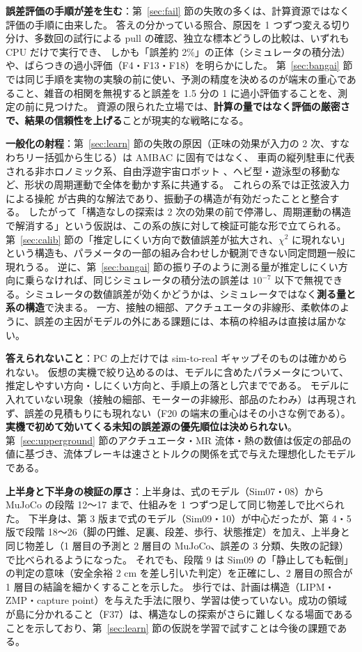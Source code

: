 \documentclass[paper=a4paper,fontsize=10pt,twocolumn,column_gap=2zw,line_length=24zw,number_of_lines=46,head_space=20mm]{jlreq}
\begin{document}
\textbf{誤差評価の手順が差を生む}：第~\ref{sec:fail} 節の失敗の多くは、計算資源ではなく評価の手順に由来した。
答えの分かっている照合、原因を 1 つずつ変える切り分け、多数回の試行による pull の確認、独立な標本どうしの比較は、いずれも CPU だけで実行でき、
しかも「誤差約 2\%」の正体（シミュレータの積分法）や、ばらつきの過小評価（F4・F13・F18）を明らかにした。
第~\ref{sec:bangai} 節では同じ手順を実物の実験の前に使い、予測の精度を決めるのが端末の重心であること、雑音の相関を無視すると誤差を 1.5 分の 1 に過小評価することを、測定の前に見つけた。
資源の限られた立場では、\textbf{計算の量ではなく評価の厳密さで、結果の信頼性を上げる}ことが現実的な戦略になる。

\textbf{一般化の射程}：第~\ref{sec:learn} 節の失敗の原因（正味の効果が入力の 2 次、すなわちリー括弧から生じる）は AMBAC に固有ではなく、
車両の縦列駐車に代表される非ホロノミック系、自由浮遊宇宙ロボット \cite{nakamura1991}、ヘビ型・遊泳型の移動など、形状の周期運動で全体を動かす系に共通する。
これらの系では正弦波入力による操舵 \cite{murray1993} が古典的な解法であり、振動子の構造が有効だったことと整合する。
したがって「構造なしの探索は 2 次の効果の前で停滞し、周期運動の構造で解消する」という仮説は、この系の族に対して検証可能な形で立てられる。
第~\ref{sec:calib} 節の「推定しにくい方向で数値誤差が拡大され、$\chi^2$ に現れない」という構造も、パラメータの一部の組み合わせしか観測できない同定問題一般に現れうる。
逆に、第~\ref{sec:bangai} 節の振り子のように測る量が推定しにくい方向に乗らなければ、同じシミュレータの積分法の誤差は $10^{-7}$ 以下で無視できる。シミュレータの数値誤差が効くかどうかは、シミュレータではなく\textbf{測る量と系の構造}で決まる。
一方、接触の細部、アクチュエータの非線形、柔軟体のように、誤差の主因がモデルの外にある課題には、本稿の枠組みは直接は届かない。

\textbf{答えられないこと}：PC の上だけでは sim-to-real ギャップそのものは確かめられない。
仮想の実機で絞り込めるのは、モデルに含めたパラメータについて、推定しやすい方向・しにくい方向と、手順上の落とし穴までである。
モデルに入れていない現象（接触の細部、モーターの非線形、部品のたわみ）は再現されず、誤差の見積もりにも現れない（F20 の端末の重心はその小さな例である）。\textbf{実機で初めて効いてくる未知の誤差源の優先順位は決められない}。
第~\ref{sec:upperground} 節のアクチュエータ・MR 流体・熱の数値は仮定の部品の値に基づき、流体ブレーキは速さとトルクの関係を式で与えた理想化したモデルである。

\textbf{上半身と下半身の検証の厚さ}：上半身は、式のモデル（Sim07・08）から MuJoCo の段階 12〜17 まで、仕組みを 1 つずつ足して同じ物差しで比べられた。
下半身は、第 3 版まで式のモデル（Sim09・10）が中心だったが、第 4・5 版で段階 18〜26（脚の円錐、足裏、段差、歩行、状態推定）を加え、上半身と同じ物差し（1 層目の予測と 2 層目の MuJoCo、誤差の 3 分類、失敗の記録）で比べられるようになった。
それでも、段階 9 は Sim09 の「静止しても転倒」の判定の意味（安全余裕 2 cm を差し引いた判定）を正確にし、2 層目の照合が 1 層目の結論を細かくすることを示した。
歩行では、計画は構造（LIPM・ZMP・capture point）を与えた手法に限り、学習は使っていない。成功の領域が島に分かれること（F37）は、構造なしの探索がさらに難しくなる場面であることを示しており、第~\ref{sec:learn} 節の仮説を学習で試すことは今後の課題である。
\end{document}
